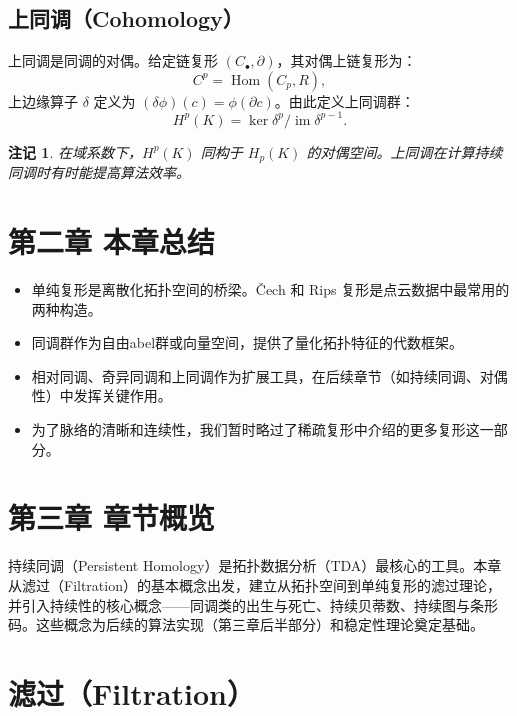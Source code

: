 \documentclass[UTF8]{ctexart}
\newtheorem{remark}[definition]{注记}
\begin{document}
\subsection{上同调（Cohomology）}
\label{subsec:cohomology}

上同调是同调的对偶。给定链复形 \((C_\bullet, \partial)\)，其对偶上链复形为：
\[
C^p = \operatorname{Hom}(C_p, R),
\]
上边缘算子 \(\delta\) 定义为 \((\delta \phi)(c) = \phi(\partial c)\)。由此定义上同调群：
\[
H^p(K) = \ker \delta^p / \operatorname{im} \delta^{p-1}.
\]

\begin{remark}
在域系数下，\(H^p(K)\) 同构于 \(H_p(K)\) 的对偶空间。上同调在计算持续同调时有时能提高算法效率。
\end{remark}

\section*{第二章 本章总结}
\begin{itemize}
    \item 单纯复形是离散化拓扑空间的桥梁。Čech 和 Rips 复形是点云数据中最常用的两种构造。
    \item 同调群作为自由abel群或向量空间，提供了量化拓扑特征的代数框架。
    \item 相对同调、奇异同调和上同调作为扩展工具，在后续章节（如持续同调、对偶性）中发挥关键作用。
    \item 为了脉络的清晰和连续性，我们暂时略过了稀疏复形中介绍的更多复形这一部分。
\end{itemize}

\newpage


\section*{第三章 章节概览}

持续同调（Persistent Homology）是拓扑数据分析（TDA）最核心的工具。本章从滤过（Filtration）的基本概念出发，建立从拓扑空间到单纯复形的滤过理论，并引入持续性的核心概念——同调类的出生与死亡、持续贝蒂数、持续图与条形码。这些概念为后续的算法实现（第三章后半部分）和稳定性理论奠定基础。

\section{滤过（Filtration）}
\label{sec:filtration}
\end{document}
